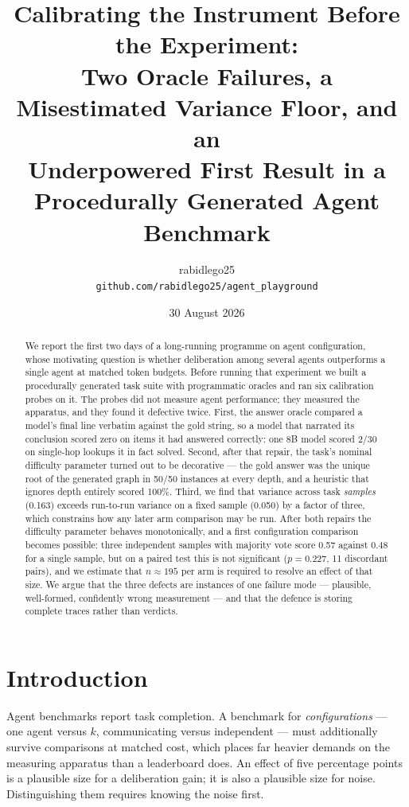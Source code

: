 \documentclass[10pt,twocolumn]{article}
\title{\vspace{-1.5em}\Large\bfseries Calibrating the Instrument Before the Experiment:\\
Two Oracle Failures, a Misestimated Variance Floor, and an\\
Underpowered First Result in a Procedurally Generated Agent Benchmark}
\author{\normalsize rabidlego25 \\ \normalsize\texttt{github.com/rabidlego25/agent\_playground}}
\date{\normalsize 30 August 2026}
\begin{document}
\maketitle

\begin{abstract}
\noindent
We report the first two days of a long-running programme on agent configuration, whose motivating
question is whether deliberation among several agents outperforms a single agent at matched token
budgets. Before running that experiment we built a procedurally generated task suite with
programmatic oracles and ran six calibration probes on it. The probes did not measure agent
performance; they measured the apparatus, and they found it defective twice. First, the answer
oracle compared a model's final line verbatim against the gold string, so a model that narrated
its conclusion scored zero on items it had answered correctly: one 8B model scored 2/30 on
single-hop lookups it in fact solved. Second, after that repair, the task's nominal difficulty
parameter turned out to be decorative --- the gold answer was the unique root of the generated
graph in 50/50 instances at every depth, and a heuristic that ignores depth entirely scored 100\%.
Third, we find that variance across task \emph{samples} (0.163) exceeds run-to-run variance on a
fixed sample (0.050) by a factor of three, which constrains how any later arm comparison may be
run. After both repairs the difficulty parameter behaves monotonically, and a first configuration
comparison becomes possible: three independent samples with majority vote score 0.57 against 0.48
for a single sample, but on a paired test this is not significant ($p = 0.227$, 11 discordant
pairs), and we estimate that $n \approx 195$ per arm is required to resolve an effect of that size.
We argue that the three defects are instances of one failure mode --- plausible, well-formed,
confidently wrong measurement --- and that the defence is storing complete traces rather than
verdicts.
\end{abstract}

\section{Introduction}

Agent benchmarks report task completion. A benchmark for \emph{configurations} --- one agent versus
$k$, communicating versus independent --- must additionally survive comparisons at matched cost,
which places far heavier demands on the measuring apparatus than a leaderboard does. An effect of
five percentage points is a plausible size for a deliberation gain; it is also a plausible size for
noise. Distinguishing them requires knowing the noise first.
\end{document}
